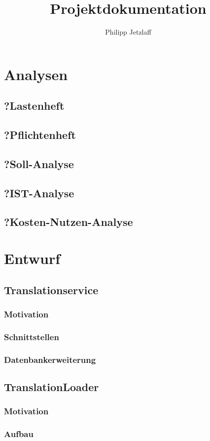 \documentclass[12pt,a4paper,oneside]{report}
\author{Philipp Jetzlaff}
\title{Projektdokumentation}
\begin{document}
    \tableofcontents
    \section{Analysen}
    \subsection{?Lastenheft}
    \subsection{?Pflichtenheft}
    \subsection{?Soll-Analyse}
    \subsection{?IST-Analyse}
    \subsection{?Kosten-Nutzen-Analyse}
    \section{Entwurf}
    \subsection{Translationservice}
    \subsubsection{Motivation}
    \subsubsection{Schnittstellen}
    \subsubsection{Datenbankerweiterung}
    \subsection{TranslationLoader}
    \subsubsection{Motivation}
    \subsubsection{Aufbau}
\end{document}
